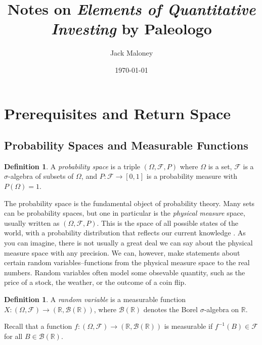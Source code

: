 \documentclass[11pt,reqno]{amsart}
\theoremstyle{definition}
\newtheorem{definition}[theorem]{Definition}
\theoremstyle{remark}
\begin{document}
\title{Notes on \textit{Elements of Quantitative Investing} by Paleologo}
\author{Jack Maloney}
\date{\today}

\maketitle

\section{Prerequisites and Return Space}

\subsection{Probability Spaces and Measurable Functions}

\begin{definition}
	A \emph{probability space} is a triple $(\Omega, \mathcal{F}, P)$ where $\Omega$ is a set, $\mathcal{F}$ is a $\sigma$-algebra of subsets of $\Omega$, and $P: \mathcal{F} \to [0,1]$ is a probability measure with $P(\Omega) = 1$.
\end{definition}

The probability space is the fundamental object of probability theory. Many sets can be probability spaces, but one in particular is the \emph{physical measure} space, usually written as $(\Omega, \mathcal{F}, P)$.
This is the space of all possible states of the world, with a probability distribution that reflects our current knowledge \cite{clayton2023bernoulli}.
As you can imagine, there is not usually a great deal we can say about the physical measure space with any precision.
We can, however, make statements about certain random variables--functions from the physical measure space to the real numbers.
Random variables often model some obsevable quantity, such as the price of a stock, the weather, or the outcome of a coin flip.

\begin{definition}
	A \emph{random variable} is a measurable function $X: (\Omega, \mathcal{F}) \to (\mathbb{R}, \mathcal{B}(\mathbb{R}))$, where $\mathcal{B}(\mathbb{R})$ denotes the Borel $\sigma$-algebra on $\mathbb{R}$.

	Recall that a function $f: (\Omega, \mathcal{F}) \to (\mathbb{R}, \mathcal{B}(\mathbb{R}))$ is measurable if $f^{-1}(B) \in \mathcal{F}$ for all $B \in \mathcal{B}(\mathbb{R})$.
\end{definition}
\end{document}
